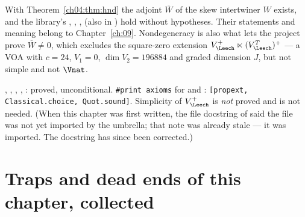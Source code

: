 \begin{remark}
With Theorem~\ref{ch04:thm:hnd} the adjoint $\overline W$ of the skew intertwiner $W$ exists, and the
library's , , ,
 (also in ) hold without hypotheses. Their
statements and meaning belong to Chapter~\ref{ch:09}. Nondegeneracy is also what lets the project
prove $\overline W\neq0$, which excludes the square-zero extension
$V_\Leech^+\ltimes(V_\Leech^T)^+$ --- a VOA with $c=24$, $V_1=0$, $\dim V_2=196884$ and graded
dimension $J$, but not simple and not $\Vnat$.
\end{remark}

\begin{status}
, , ,
, : proved, unconditional. \texttt{\#print
axioms} for  and : \texttt{[propext,
Classical.choice, Quot.sound]}. Simplicity of $V_\Leech^+$ is \emph{not} proved and is not needed.
(When this chapter was first written, the file docstring of  said the file was not yet
imported by the umbrella; that note was already stale --- it was imported. The docstring has since been
corrected.)
\end{status}
\section{Traps and dead ends of this chapter, collected}\label{ch04:sec:traps}

